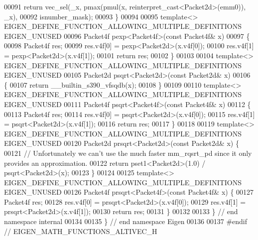 \begin{DoxyCode}
00091   \textcolor{keywordflow}{return} vec\_sel(\_x, pmax(pmul(x, reinterpret\_cast<Packet2d>(emm0)), \_x),
00092                  isnumber\_mask);
00093 \}
00094 
00095 \textcolor{keyword}{template}<> EIGEN\_DEFINE\_FUNCTION\_ALLOWING\_MULTIPLE\_DEFINITIONS EIGEN\_UNUSED
00096 Packet4f pexp<Packet4f>(\textcolor{keyword}{const} Packet4f& x)
00097 \{
00098   Packet4f res;
00099   res.v4f[0] = pexp<Packet2d>(x.v4f[0]);
00100   res.v4f[1] = pexp<Packet2d>(x.v4f[1]);
00101   \textcolor{keywordflow}{return} res;
00102 \}
00103 
00104 \textcolor{keyword}{template}<> EIGEN\_DEFINE\_FUNCTION\_ALLOWING\_MULTIPLE\_DEFINITIONS EIGEN\_UNUSED
00105 Packet2d psqrt<Packet2d>(\textcolor{keyword}{const} Packet2d& x)
00106 \{
00107   \textcolor{keywordflow}{return}  \_\_builtin\_s390\_vfsqdb(x);
00108 \}
00109 
00110 \textcolor{keyword}{template}<> EIGEN\_DEFINE\_FUNCTION\_ALLOWING\_MULTIPLE\_DEFINITIONS EIGEN\_UNUSED
00111 Packet4f psqrt<Packet4f>(\textcolor{keyword}{const} Packet4f& x)
00112 \{
00113   Packet4f res;
00114   res.v4f[0] = psqrt<Packet2d>(x.v4f[0]);
00115   res.v4f[1] = psqrt<Packet2d>(x.v4f[1]);
00116   \textcolor{keywordflow}{return} res;
00117 \}
00118 
00119 \textcolor{keyword}{template}<> EIGEN\_DEFINE\_FUNCTION\_ALLOWING\_MULTIPLE\_DEFINITIONS EIGEN\_UNUSED
00120 Packet2d prsqrt<Packet2d>(\textcolor{keyword}{const} Packet2d& x) \{
00121   \textcolor{comment}{// Unfortunately we can't use the much faster mm\_rqsrt\_pd since it only provides an approximation.}
00122   \textcolor{keywordflow}{return} pset1<Packet2d>(1.0) / psqrt<Packet2d>(x);
00123 \}
00124 
00125 \textcolor{keyword}{template}<> EIGEN\_DEFINE\_FUNCTION\_ALLOWING\_MULTIPLE\_DEFINITIONS EIGEN\_UNUSED
00126 Packet4f prsqrt<Packet4f>(\textcolor{keyword}{const} Packet4f& x) \{
00127   Packet4f res;
00128   res.v4f[0] = prsqrt<Packet2d>(x.v4f[0]);
00129   res.v4f[1] = prsqrt<Packet2d>(x.v4f[1]);
00130   \textcolor{keywordflow}{return} res;
00131 \}
00132 
00133 \}  \textcolor{comment}{// end namespace internal}
00134 
00135 \}  \textcolor{comment}{// end namespace Eigen}
00136 
00137 \textcolor{preprocessor}{#endif  // EIGEN\_MATH\_FUNCTIONS\_ALTIVEC\_H}
\end{DoxyCode}
